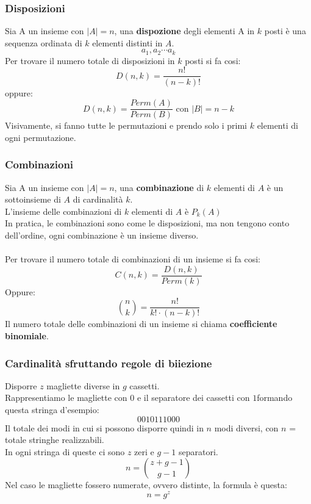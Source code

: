\documentclass[a4paper,12pt]{article}
\begin{document}
\subsubsection{Disposizioni}
Sia A un insieme con $|A| = n$, una \textbf{dispozione} degli elementi A in $k$ posti è una sequenza ordinata di $k$ elementi distinti in $A$.
\[
a_1, a_2 \cdots a_k
\] 
Per trovare il numero totale di disposizioni in $k$ posti si fa cosi:
\[
D(n,k) = \frac{n!}{(n-k)!}
\]
oppure:
\[
D(n,k) = \frac{Perm(A)}{Perm(B)} \text{ con } |B| = n - k
\]
Visivamente, si fanno tutte le permutazioni e prendo solo i primi $k$ elementi di ogni permutazione.

\subsubsection{Combinazioni}
Sia A un insieme con $|A| = n$, una \textbf{combinazione} di $k$ elementi di $A$ è un sottoinsieme di $A$ di cardinalità $k$.\\
L'insieme delle combinazioni di $k$ elementi di $A$ è $P_k(A)$\\
In pratica, le combinazioni sono come le disposizioni, ma non tengono conto dell'ordine, ogni combinazione è un insieme diverso.\\\\
Per trovare il numero totale di combinazioni di un insieme si fa cosi:
\[
C(n,k) = \frac{D(n,k)}{Perm(k)}
\]
Oppure:
\[
\binom{n}{k} = \frac{n!}{k! \cdot (n-k)!} 
\]
Il numero totale delle combinazioni di un insieme si chiama \textbf{coefficiente binomiale}.

\subsubsection{Cardinalità sfruttando regole di biiezione}
Disporre $z$ magliette diverse in $g$ cassetti.\\
Rappresentiamo le magliette con $0$ e il separatore dei cassetti con $1$formando questa stringa d'esempio:\\
\[
    0010111000
\] 
Il totale dei modi in cui si possono disporre quindi in $n$ modi diversi, con $n$ = totale stringhe realizzabili.\\
In ogni stringa di queste ci sono $z$ zeri e $g-1$ separatori.
\[
n = \binom{z+g-1}{g-1}
\]
Nel caso le magliette fossero numerate, ovvero distinte, la formula è questa:
\[
n = g^z
\]
\end{document}
